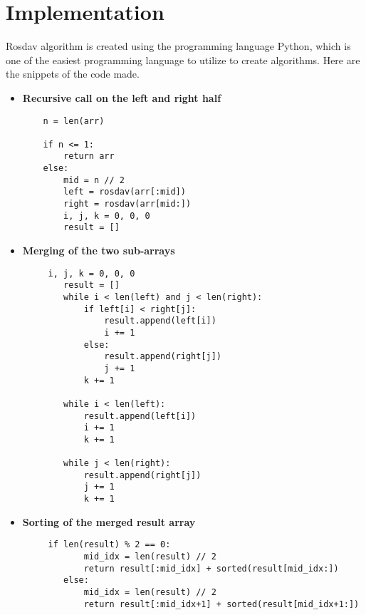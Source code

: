\documentclass[12pt]{article}
\begin{document}
\section{Implementation}
Rosdav algorithm is created using the programming language Python, which is one of the easiest programming language to utilize to create algorithms. Here are the snippets of the code made.
\begin{itemize}

\item \textbf{Recursive call on the left and right half}
\begin {verbatim}
    n = len(arr)

    if n <= 1:
        return arr
    else:
        mid = n // 2
        left = rosdav(arr[:mid])
        right = rosdav(arr[mid:])
        i, j, k = 0, 0, 0
        result = []
\end{verbatim}

\item \textbf{Merging of the two sub-arrays}
\begin{verbatim}
     i, j, k = 0, 0, 0
        result = []
        while i < len(left) and j < len(right):
            if left[i] < right[j]:
                result.append(left[i])
                i += 1
            else:
                result.append(right[j])
                j += 1
            k += 1
        
        while i < len(left):
            result.append(left[i])
            i += 1
            k += 1
        
        while j < len(right):
            result.append(right[j])
            j += 1
            k += 1
\end{verbatim}

\item \textbf{Sorting of the merged result array}
\begin{verbatim}
     if len(result) % 2 == 0:
            mid_idx = len(result) // 2
            return result[:mid_idx] + sorted(result[mid_idx:])
        else:
            mid_idx = len(result) // 2
            return result[:mid_idx+1] + sorted(result[mid_idx+1:])
\end{verbatim}
\end{itemize}
\end{document}
